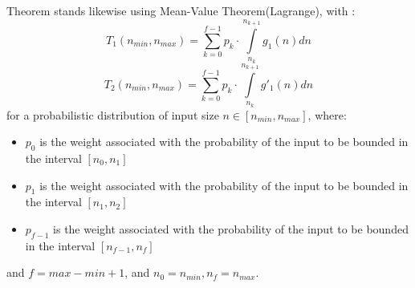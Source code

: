 \begin{remark}
Theorem stands likewise using Mean-Value Theorem(Lagrange), with :
\[  T_{1}(n_{min}, n_{max}) =\sum\limits_{k=0}^{f-1} p_{k} \cdot \int\limits_{n_{k}}^{n_{k+1}} g_{1}(n) dn  \]
\[  T_{2}(n_{min}, n_{max}) =\sum\limits_{k=0}^{f-1} p_{k} \cdot \int\limits_{n_{k}}^{n_{k+1}} g'_{1}(n) dn  \]
for a probabilistic distribution of input size $n \in [n_{min}, n_{max}]$, where:
\begin{itemize}
	\item $p_{0}$ is the weight associated with the probability of the input to be bounded in the interval $[n_{0}, n_{1}]$
	\item $p_{1}$ is the weight associated with the probability of the input to be bounded in the interval $[n_{1}, n_{2}]$
	\item $p_{f-1}$ is the weight associated with the probability of the input to be bounded in the interval $[n_{f-1}, n_{f}]$
\end{itemize}
and $f = max - min + 1$, and $n_{0} = n_{min}, n_{f} = n_{max}$.

\end{remark}